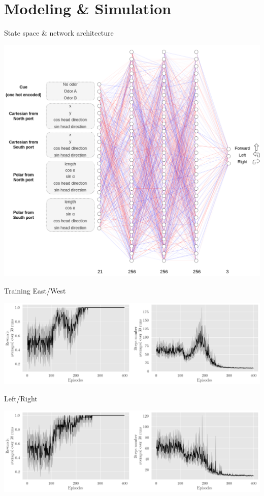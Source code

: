 \documentclass[bigger]{beamer}
\begin{document}
\section{Modeling \& Simulation}
\label{sec:orgcb3bbdf}
\begin{frame}[label={sec:org3b7f8e9}]{State space \& network architecture}
\begin{center}
\includegraphics[height=0.95\textheight]{medias/NN-architecture-MLP.drawio.png}
\end{center}
\end{frame}
\begin{frame}[label={sec:org29e2ead}]{Training}
East/West
\begin{center}
\includegraphics[height=0.35\textheight]{medias/EastWest/training.png}
\end{center}
Left/Right
\begin{center}
\includegraphics[height=0.35\textheight]{medias/LeftRight/training.png}
\end{center}
\end{frame}
\end{document}
